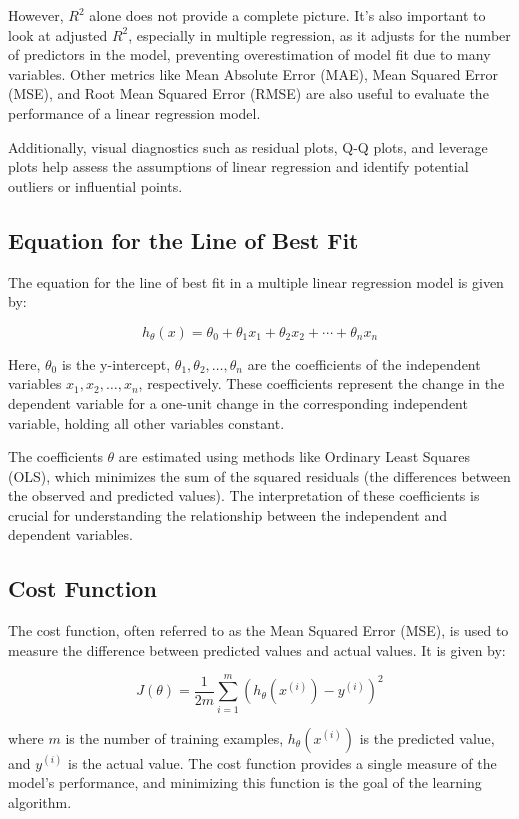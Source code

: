 \documentclass{article}
\theoremstyle{definition}
\theoremstyle{theorem}
\theoremstyle{theorem}
\theoremstyle{theorem}
\theoremstyle{theorem}
\theoremstyle{definition}
\theoremstyle{definition}
\theoremstyle{definition}
\theoremstyle{definition}
\theoremstyle{definition}
\begin{document}
However, \( R^2 \) alone does not provide a complete picture. It's also important to look at adjusted \( R^2 \), especially in multiple regression, as it adjusts for the number of predictors in the model, preventing overestimation of model fit due to many variables. Other metrics like Mean Absolute Error (MAE), Mean Squared Error (MSE), and Root Mean Squared Error (RMSE) are also useful to evaluate the performance of a linear regression model.

Additionally, visual diagnostics such as residual plots, Q-Q plots, and leverage plots help assess the assumptions of linear regression and identify potential outliers or influential points.

\subsection{Equation for the Line of Best Fit}

The equation for the line of best fit in a multiple linear regression model is given by:

\[
h_\theta(x) = \theta_0 + \theta_1 x_1 + \theta_2 x_2 + \cdots + \theta_n x_n
\]

Here, \( \theta_0 \) is the y-intercept, \( \theta_1, \theta_2, \ldots, \theta_n \) are the coefficients of the independent variables \( x_1, x_2, \ldots, x_n \), respectively. These coefficients represent the change in the dependent variable for a one-unit change in the corresponding independent variable, holding all other variables constant.

The coefficients \( \theta \) are estimated using methods like Ordinary Least Squares (OLS), which minimizes the sum of the squared residuals (the differences between the observed and predicted values). The interpretation of these coefficients is crucial for understanding the relationship between the independent and dependent variables.

\subsection{Cost Function}

The cost function, often referred to as the Mean Squared Error (MSE), is used to measure the difference between predicted values and actual values. It is given by:

\[
J(\theta) = \frac{1}{2m} \sum_{i=1}^{m} (h_\theta(x^{(i)}) - y^{(i)})^2
\]

where \( m \) is the number of training examples, \( h_\theta(x^{(i)}) \) is the predicted value, and \( y^{(i)} \) is the actual value. The cost function provides a single measure of the model's performance, and minimizing this function is the goal of the learning algorithm.
\end{document}
